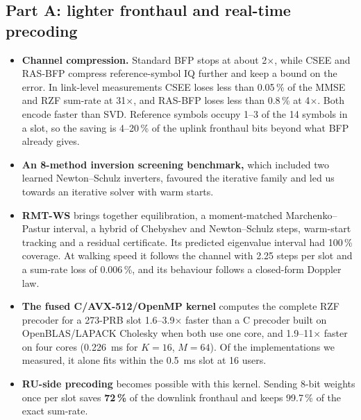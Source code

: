 \subsection*{Part A: lighter fronthaul and real-time precoding}
\begin{itemize}
  \item \textbf{Channel compression.} Standard BFP stops at about 2$\times$, while CSEE and RAS-BFP compress reference-symbol IQ further and keep a bound on the error. In link-level measurements CSEE loses less than 0.05\,\% of the MMSE and RZF sum-rate at 31$\times$, and RAS-BFP loses less than 0.8\,\% at 4$\times$. Both encode faster than SVD. Reference symbols occupy 1--3 of the 14 symbols in a slot, so the saving is 4--20\,\% of the uplink fronthaul bits beyond what BFP already gives.
  \item \textbf{An 8-method inversion screening benchmark,} which included two learned Newton--Schulz inverters, favoured the iterative family and led us towards an iterative solver with warm starts.
  \item \textbf{RMT-WS} brings together equilibration, a moment-matched Marchenko--Pastur interval, a hybrid of Chebyshev and Newton--Schulz steps, warm-start tracking and a residual certificate. Its predicted eigenvalue interval had 100\,\% coverage. At walking speed it follows the channel with 2.25 steps per slot and a sum-rate loss of 0.006\,\%, and its behaviour follows a closed-form Doppler law.
  \item \textbf{The fused C/AVX-512/OpenMP kernel} computes the complete RZF precoder for a 273-PRB slot 1.6--3.9$\times$ faster than a C precoder built on OpenBLAS/LAPACK Cholesky when both use one core, and 1.9--11$\times$ faster on four cores (0.226~ms for $K=16$, $M=64$). Of the implementations we measured, it alone fits within the 0.5~ms slot at 16 users.
  \item \textbf{RU-side precoding} becomes possible with this kernel. Sending 8-bit weights once per slot saves \textbf{72\,\%} of the downlink fronthaul and keeps 99.7\,\% of the exact sum-rate.
\end{itemize}


